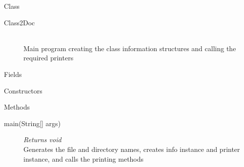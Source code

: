 \documentclass[11pt,a4paper]{article}
\newenvironment{di}
{\begin{flushright}
\begin{minipage}{0.95\textwidth}
\begin{description}
}
{\end{description}
\end{minipage}
\end{flushright}
}
\begin{document}
\noindent
\colorbox{classbg}{\parbox{1.0\textwidth}{\Large{Class}}}
\begin{di}
\item[\large{Class2Doc}]\qquad\\
Main program creating the class information structures and calling the required printers
\end{di}
\colorbox{fieldbg}{\parbox{1.0\textwidth}{\Large{Fields}}}
\noindent\colorbox{conbg}{\parbox{1.0\textwidth}{\Large{Constructors}}}
\colorbox{descriptbg}{\parbox{1.0\textwidth}{\Large{Methods}}}
\begin{di}
\item[{main(String[] args)}]\emph{Returns void}\\
Generates the file and directory names, creates info instance and printer instance, and calls the printing methods\\
\end{di}
\end{document}
